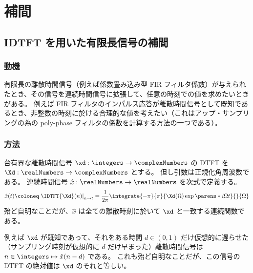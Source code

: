 \chapter{補間}
    \section{IDTFT を用いた有限長信号の補間}
        \subsection{動機}
            有限長の離散時間信号（例えば係数畳み込み型 FIR フィルタ係数）が与えられたとき、その信号を連続時間信号に拡張して、任意の時刻での値を求めたいときがある。
            例えば FIR フィルタのインパルス応答が離散時間信号として既知であるとき、非整数の時刻に於ける合理的な値を考えたい（これはアップ・サンプリングの為の poly-phase フィルタの係数を計算する方法の一つである）。
        \subsection{方法}
            \label{IDTFT を用いた有限長信号の補間>方法}
            台有界な離散時間信号 $\xd:\integers\to\complexNumbers$ の DTFT を $\Xd:\realNumbers\to\complexNumbers$ とする。
            但し引数は正規化角周波数である。
            連続時間信号 $\hat{x}:\realNumbers\to\realNumbers$ を次式で定義する。
            \[ \hat{x}(t)\coloneq\left.\IDTFT{\Xd}(n)\right|_{n\to t} = \frac{1}{2\pi}\integrate{-\pi}{\pi}{\Xd(\Omega)\exp\parens*{i\Omega t}}{}{\Omega} \]
            殆ど自明なことだが、$\hat{x}$ は全ての離散時刻に於いて $\xd$ と一致する連続関数である。
            \par
            例えば $\xd$ が既知であって、それをある時間 $d\in(0,1)$ だけ仮想的に遅らせた（サンプリング時刻が仮想的に $d$ だけ早まった）離散時間信号は $n\in\integers\mapsto\hat{x}(n-d)$ である。
            これも殆ど自明なことだが、この信号の DTFT の絶対値は $\xd$ のそれと等しい。
